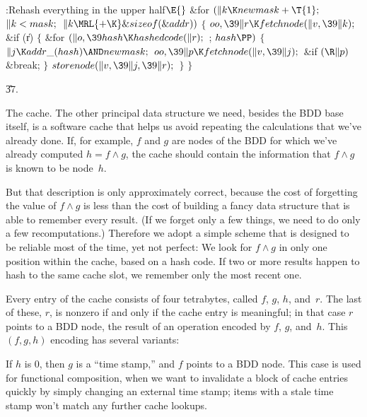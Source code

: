 \Y\B\4:Rehash everything in the upper half\X${}\E{}$\6
\&{for} ${}(\|k\K\\{newmask}+\T{1};{}$ ${}\|k<\\{mask};{}$ ${}\|k\MRL{+{\K}}%
\&{sizeof}(\&{addr})){}$\5
${}\{{}$\1\6
${}\\{oo},\39\|r\K\\{fetchnode}(\|v,\39\|k);{}$\6
\&{if} (\|r)\5
${}\{{}$\1\6
\&{for} ${}(\|o,\39\\{hash}\K\\{hashedcode}(\|r);{}$  ; ${}\\{hash}\PP){}$\5
${}\{{}$\1\6
${}\|j\K\\{addr\_}(\\{hash})\AND\\{newmask};{}$\6
${}\\{oo},\39\|p\K\\{fetchnode}(\|v,\39\|j);{}$\6
\&{if} ${}(\R\|p){}$\1\5
\&{break};\2\6
\4${}\}{}$\2\6
${}\\{storenode}(\|v,\39\|j,\39\|r);{}$\6
\4${}\}{}$\2\6
\4${}\}{}$\2\par
\U37.\fi

The cache. The other principal data structure we need, besides the BDD
base
itself, is a software cache that helps us avoid repeating the calculations
that we've already done. If, for example, $f$ and $g$ are nodes of the BDD for
which we've already computed $h=f\land g$, the cache should contain the
information that $f\land g$ is known to be node~$h$.

But that description is only approximately correct, because
the cost of forgetting the value of $f\land g$ is less than the cost of
building a fancy data structure that is able to remember every result.
(If we forget only a few things, we need to do only a few recomputations.)
Therefore we adopt a simple scheme that is designed to be reliable most of
the time, yet not perfect: We look for $f\land g$ in only one position
within the cache, based on a hash code. If two or more results happen
to hash to the same cache slot, we remember only the most recent one.

Every entry of the cache consists of four tetrabytes, called
$f$, $g$, $h$, and~$r$. The last of these, $r$, is nonzero if and only if the
cache entry is meaningful; in that case $r$ points to a BDD node, the result
of an operation encoded by $f$, $g$, and~$h$.
This $(f,g,h)$ encoding has several variants:

\smallskip\textindent{$\bullet$} If $h$ is 0, then $g$ is
a ``time stamp,'' and $f$ points to a BDD node. This case is used for
functional composition, when we want to
invalidate a block of cache entries quickly by simply changing an
external time stamp; items with a stale time stamp won't match any further
cache lookups.

